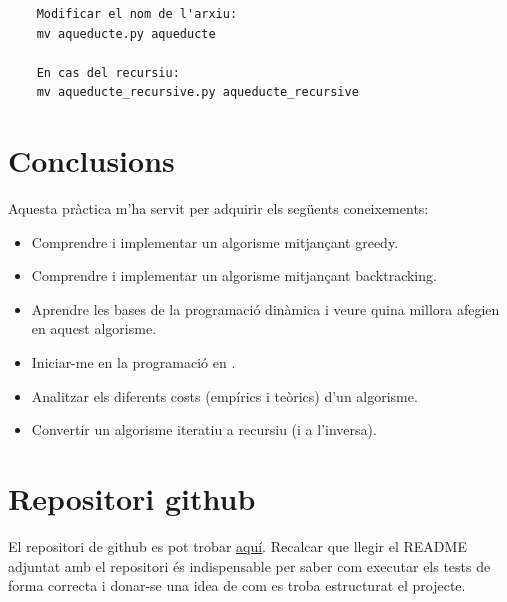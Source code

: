 \documentclass[12pt, letterpaper]{article}
\begin{document}
\begin{enumerate}
\begin{verbatim}
    Modificar el nom de l'arxiu:
    mv aqueducte.py aqueducte

    En cas del recursiu:
    mv aqueducte_recursive.py aqueducte_recursive
    \end{verbatim}
\end{enumerate}

\section{Conclusions}
Aquesta pràctica m'ha servit per adquirir els següents coneixements:
\begin{itemize}
    \item Comprendre i implementar un algorisme mitjançant greedy.
    \item Comprendre i implementar un algorisme mitjançant backtracking.
    \item Aprendre les bases de la programació dinàmica i veure quina millora afegien en aquest algorisme.
    \item Iniciar-me en la programació en \cpluspluslogo.
    \item Analitzar els diferents costs (empírics i teòrics) d'un algorisme.
    \item Convertir un algorisme iteratiu a recursiu (i a l'inversa).
\end{itemize}

\newpage

\appendix

\section{Repositori github}
\label{github}

El repositori de github es pot trobar \href{https://github.com/Algorismia/Aquaeductus-Optimus}{aquí}. Recalcar que llegir el README adjuntat amb el repositori és indispensable per saber com executar els tests de forma correcta i donar-se una idea de com es troba estructurat el projecte. 
\end{document}
